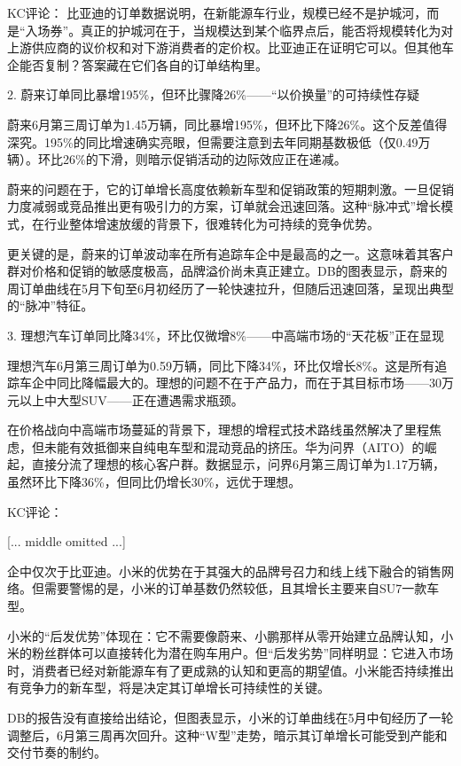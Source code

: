 \documentclass[11pt]{ctexart}
\begin{document}
KC评论： 比亚迪的订单数据说明，在新能源车行业，规模已经不是护城河，而是“入场券”。真正的护城河在于，当规模达到某个临界点后，能否将规模转化为对上游供应商的议价权和对下游消费者的定价权。比亚迪正在证明它可以。但其他车企能否复制？答案藏在它们各自的订单结构里。

2. 蔚来订单同比暴增195\%，但环比骤降26\%——“以价换量”的可持续性存疑

蔚来6月第三周订单为1.45万辆，同比暴增195\%，但环比下降26\%。这个反差值得深究。195\%的同比增速确实亮眼，但需要注意到去年同期基数极低（仅0.49万辆）。环比26\%的下滑，则暗示促销活动的边际效应正在递减。

蔚来的问题在于，它的订单增长高度依赖新车型和促销政策的短期刺激。一旦促销力度减弱或竞品推出更有吸引力的方案，订单就会迅速回落。这种“脉冲式”增长模式，在行业整体增速放缓的背景下，很难转化为可持续的竞争优势。

更关键的是，蔚来的订单波动率在所有追踪车企中是最高的之一。这意味着其客户群对价格和促销的敏感度极高，品牌溢价尚未真正建立。DB的图表显示，蔚来的周订单曲线在5月下旬至6月初经历了一轮快速拉升，但随后迅速回落，呈现出典型的“脉冲”特征。

3. 理想汽车订单同比降34\%，环比仅微增8\%——中高端市场的“天花板”正在显现

理想汽车6月第三周订单为0.59万辆，同比下降34\%，环比仅增长8\%。这是所有追踪车企中同比降幅最大的。理想的问题不在于产品力，而在于其目标市场——30万元以上中大型SUV——正在遭遇需求瓶颈。

在价格战向中高端市场蔓延的背景下，理想的增程式技术路线虽然解决了里程焦虑，但未能有效抵御来自纯电车型和混动竞品的挤压。华为问界（AITO）的崛起，直接分流了理想的核心客户群。数据显示，问界6月第三周订单为1.17万辆，虽然环比下降36\%，但同比仍增长30\%，远优于理想。

KC评论：

[... middle omitted ...]

企中仅次于比亚迪。小米的优势在于其强大的品牌号召力和线上线下融合的销售网络。但需要警惕的是，小米的订单基数仍然较低，且其增长主要来自SU7一款车型。

小米的“后发优势”体现在：它不需要像蔚来、小鹏那样从零开始建立品牌认知，小米的粉丝群体可以直接转化为潜在购车用户。但“后发劣势”同样明显：它进入市场时，消费者已经对新能源车有了更成熟的认知和更高的期望值。小米能否持续推出有竞争力的新车型，将是决定其订单增长可持续性的关键。

DB的报告没有直接给出结论，但图表显示，小米的订单曲线在5月中旬经历了一轮调整后，6月第三周再次回升。这种“W型”走势，暗示其订单增长可能受到产能和交付节奏的制约。
\end{document}
